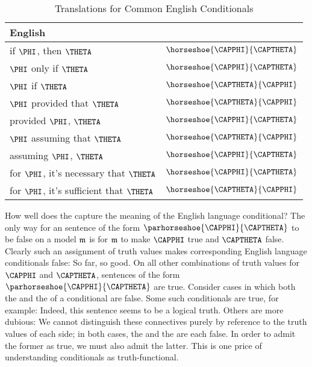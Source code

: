 \begin{table}
	\renewcommand{\arraystretch}{1.5}%
	\begin{center}
		\begin{tabular}{ l l } %
			\toprule
			\textbf{English} & \textbf{\GSL{}} \\ 
			\midrule
			if $\PHI$, then $\THETA$ & $\horseshoe{\CAPPHI}{\CAPTHETA}$ \\
			$\PHI$ only if $\THETA$ & $\horseshoe{\CAPPHI}{\CAPTHETA}$ \\
			$\PHI$ if $\THETA$ & $\horseshoe{\CAPTHETA}{\CAPPHI}$ \\
			$\PHI$ provided that $\THETA$ & $\horseshoe{\CAPTHETA}{\CAPPHI}$ \\
			provided $\PHI$, $\THETA$ & $\horseshoe{\CAPPHI}{\CAPTHETA}$ \\
			$\PHI$ assuming that $\THETA$ & $\horseshoe{\CAPTHETA}{\CAPPHI}$ \\
			assuming $\PHI$, $\THETA$ & $\horseshoe{\CAPPHI}{\CAPTHETA}$ \\
			for $\PHI$, it's necessary that $\THETA$ & $\horseshoe{\CAPPHI}{\CAPTHETA}$ \\
			for $\PHI$, it's sufficient that $\THETA$ & $\horseshoe{\CAPTHETA}{\CAPPHI}$ \\
			\bottomrule
		\end{tabular}%
		\caption{Translations for Common English Conditionals}
		\label{TransTableA}
	\end{center}
\end{table}

How well does the \mention{$\HORSESHOE$} capture the meaning of the English language conditional?  The only way for an \GSL{} sentence of the form $\parhorseshoe{\CAPPHI}{\CAPTHETA}$ to be false on a model $\mathfrak{m}$ is for $\mathfrak{m}$ to make $\CAPPHI$ true and $\CAPTHETA$ false.  Clearly such an assignment of truth values makes corresponding English language conditionals false:   So far, so good.  On all other combinations of truth values for $\CAPPHI$ and $\CAPTHETA$, \GSL{} sentences of the form $\parhorseshoe{\CAPPHI}{\CAPTHETA}$ are true.  Consider cases in which both the  and the  of a conditional are false.  Some such conditionals are true, for example:   Indeed, this sentence seems to be a logical truth.  Others are more dubious:   We cannot distinguish these connectives purely by reference to the truth values of each side; in both cases, the  and the  are each false.  In order to admit the former as true, we must also admit the latter.  This is one price of understanding conditionals as truth-functional.

